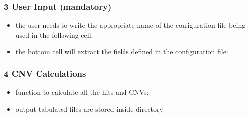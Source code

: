 \documentclass[letterpaper,10pt,english]{sphinxhowto}
\begin{document}
\subsubsection{3 \sphinxhyphen{} User Input (mandatory)}
\label{\detokenize{index:user-input-mandatory}}\begin{itemize}
\item {} 
\sphinxAtStartPar
the user needs to write the appropriate name of the configuration file being used in the following cell:

\end{itemize}

\begin{sphinxVerbatim}[commandchars=\\\{\}]
 \PYG{p}{[} \PYG{p}{]}   
\end{sphinxVerbatim}
\begin{itemize}
\item {} 
\sphinxAtStartPar
the bottom cell will extract the fields defined in the configuration file:

\end{itemize}

\begin{sphinxVerbatim}[commandchars=\\\{\}]
 \PYG{p}{[} \PYG{p}{]}   
\end{sphinxVerbatim}


\subsubsection{4 \sphinxhyphen{} CNV Calculations}
\label{\detokenize{index:cnv-calculations}}\begin{itemize}
\item {} 
\sphinxAtStartPar
function to calculate all the hits and CNVs:

\end{itemize}

\begin{sphinxVerbatim}[commandchars=\\\{\}]
 \PYG{p}{[} \PYG{p}{]} 
\end{sphinxVerbatim}
\begin{itemize}
\item {} 
\sphinxAtStartPar
output tabulated files are stored inside  directory

\end{itemize}
\end{document}
